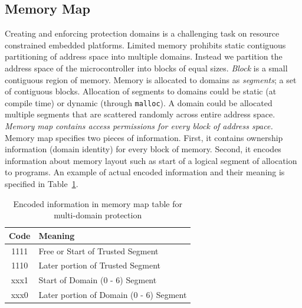\subsection{Memory Map}
%
%
Creating and enforcing protection domains is a challenging task on resource constrained embedded platforms.
%
Limited memory prohibits static contiguous partitioning of address space into multiple domains.
%
Instead we partition the address space of the microcontroller into blocks of equal sizes.
%
\textit{Block} is a small contiguous region of memory.
%
Memory is allocated to domains as \textit{segments}; a set of contiguous blocks.
%
Allocation of segments to domains could be static (at compile time) or dynamic (through \texttt{malloc}).
%
A domain could be allocated multiple segments that are scattered randomly across entire address space.
%
\textit{Memory map contains access permissions for every block of address space.}
%
Memory map specifies two pieces of information.
% 
First, it contains ownership information (domain identity) for every block of memory.
%
Second, it encodes information about memory layout such as start of a logical segment of allocation to programs.
%
An example of actual encoded information and their meaning is specified in Table~\ref{tab:mmap_table}.
%
\begin{table}[htdp]
\centering
\small{
\begin{tabular}{|c|l|}
	\hline
	Code & Meaning\\
	\hline
	1111 & Free or Start of Trusted Segment\\
	1110 & Later portion of Trusted Segment\\
	xxx1 & Start of Domain (0 - 6) Segment \\
	xxx0 & Later portion of Domain (0 - 6) Segment\\
	\hline
\end{tabular}}
\caption{Encoded information in memory map table for multi-domain protection}
\label{tab:mmap_table}
\end{table}


